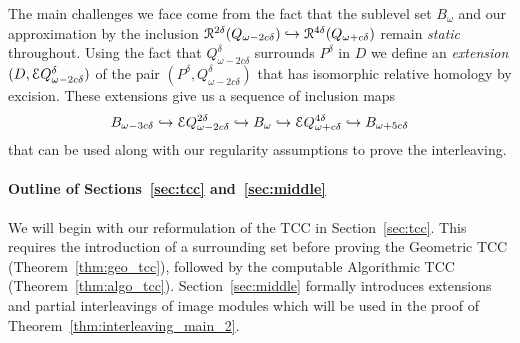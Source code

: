 The main challenges we face come from the fact that the sublevel set $B_\omega$ and our approximation by the inclusion $\mathcal{R}^{2\delta}(Q_{\omega-2c\delta})\hookrightarrow \mathcal{R}^{4\delta}(Q_{\omega+c\delta})$ remain \emph{static} throughout.
Using the fact that $Q_{\omega-2c\delta}^\delta$ surrounds $P^\delta$ in $D$ we define an \emph{extension} $(D,\mathcal{E} Q_{\omega-2c\delta}^\delta)$ of the pair $(P^\delta, Q_{\omega-2c\delta}^\delta)$ that has isomorphic relative homology by excision.
These extensions give us a sequence of inclusion maps
\[ B_{\omega-3c\delta}\hookrightarrow \mathcal{E} Q_{\omega-2c\delta}^{2\delta}\hookrightarrow B_\omega\hookrightarrow \mathcal{E} Q_{\omega+c\delta}^{4\delta}\hookrightarrow B_{\omega+5c\delta}\]
that can be used along with our regularity assumptions to prove the interleaving. %

\paragraph*{Outline of Sections~\ref{sec:tcc} and~\ref{sec:middle}}

We will begin with our reformulation of the TCC in Section~\ref{sec:tcc}.
This requires the introduction of a surrounding set before proving the Geometric TCC (Theorem~\ref{thm:geo_tcc}), followed by the computable Algorithmic TCC  (Theorem~\ref{thm:algo_tcc}).
Section~\ref{sec:middle} formally introduces extensions and partial interleavings of image modules which will be used in the proof of Theorem~\ref{thm:interleaving_main_2}.


%

